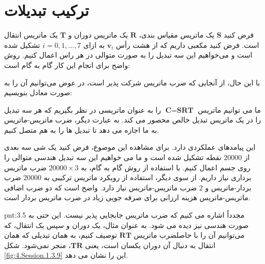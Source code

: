 \section{\textbf{ترکیب تبدیلات}}
\label{sec:3.3}
{
    \Large
    \begin{spacing}{1.5}
        فرض کنید $\textbf{S}$ یک ماتریس مقیاس بندی، $\textbf{R}$ یک ماتریس دوران و $\textbf{T}$ یک ماتریس انتقال است.
        فرض کنید مکعبی داریم که از هشت رأس $\textbf{v}_{i}$ به ازای $i=0,1,...,7$ تشکیل شده است و
        می‌خواهیم این سه تبدیل را به صورت متوالی در هر راس اعمال کنیم. روش واضح برای انجام این کار گام به گام است:

        \begin{center}
        \end{center}

        با این حال، از آنجایی که ضرب ماتریس شرکت پذیر است، در عوض می‌توانیم آن را به صورت معادل بنویسیم:

        \begin{center}
        \end{center}

        ما می توانیم ماتریس $\textbf{C}=\textbf{SRT}$ را به عنوان ماتریسی در نظر بگیریم که هر سه تبدیل را در یک ماتریس تبدیل خالص محصور می کند.
        به عبارت دیگر، ضرب ماتریس-ماتریس به ما اجازه می دهد تا تبدیل ها را به هم متصل کنیم.

        این پیامدهای عملکردی دارد. برای مشاهده این موضوع، فرض کنید یک شی سه بعدی از $20000$ نقطه تشکیل شده است و ما می خواهیم این سه تبدیل هندسی متوالی را روی جسم اعمال کنیم.
        با استفاده از روش گام به گام، به $20000\times 3$ ضرب ماتریس برداری نیاز داریم.
        از سوی دیگر، استفاده از رویکرد ماتریس ترکیبی به $20000$ ضرب بردار-ماتریس و $2$ ضرب ماتریس-ماتریس نیاز دارد. واضح است که دو ضرب اضافی ماتریس-ماتریس هزینه ارزانی برای صرفه جویی زیاد در ضرب ماتریس بردار است.

        \begin{point}{pnt:3.5}
            \Large
            مجدداً اشاره می کنیم که ضرب ماتریس جابجایی پذیر نیست. این حتی به صورت هندسی نیز دیده می شود.
            به عنوان مثال، یک دوران و سپس یک انتقال، که می‌توانیم آن را با حاصلضرب ماتریس $\textbf{RT}$ توصیف کنیم، به همان تبدیلی که همان انتقال به دنبال آن دوران یکسان است، یعنی $\textbf{TR}$، منجر نمی‌شود. شکل \ref{fig:4.Session.1.3.9} این را نشان می دهد.
        \end{point}


\end{spacing}}
